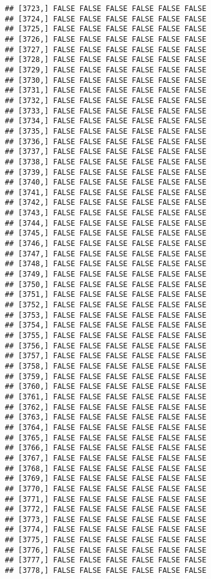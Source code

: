 \documentclass[
]{article}
\begin{document}
\begin{verbatim}
## [3723,] FALSE FALSE FALSE FALSE FALSE FALSE
## [3724,] FALSE FALSE FALSE FALSE FALSE FALSE
## [3725,] FALSE FALSE FALSE FALSE FALSE FALSE
## [3726,] FALSE FALSE FALSE FALSE FALSE FALSE
## [3727,] FALSE FALSE FALSE FALSE FALSE FALSE
## [3728,] FALSE FALSE FALSE FALSE FALSE FALSE
## [3729,] FALSE FALSE FALSE FALSE FALSE FALSE
## [3730,] FALSE FALSE FALSE FALSE FALSE FALSE
## [3731,] FALSE FALSE FALSE FALSE FALSE FALSE
## [3732,] FALSE FALSE FALSE FALSE FALSE FALSE
## [3733,] FALSE FALSE FALSE FALSE FALSE FALSE
## [3734,] FALSE FALSE FALSE FALSE FALSE FALSE
## [3735,] FALSE FALSE FALSE FALSE FALSE FALSE
## [3736,] FALSE FALSE FALSE FALSE FALSE FALSE
## [3737,] FALSE FALSE FALSE FALSE FALSE FALSE
## [3738,] FALSE FALSE FALSE FALSE FALSE FALSE
## [3739,] FALSE FALSE FALSE FALSE FALSE FALSE
## [3740,] FALSE FALSE FALSE FALSE FALSE FALSE
## [3741,] FALSE FALSE FALSE FALSE FALSE FALSE
## [3742,] FALSE FALSE FALSE FALSE FALSE FALSE
## [3743,] FALSE FALSE FALSE FALSE FALSE FALSE
## [3744,] FALSE FALSE FALSE FALSE FALSE FALSE
## [3745,] FALSE FALSE FALSE FALSE FALSE FALSE
## [3746,] FALSE FALSE FALSE FALSE FALSE FALSE
## [3747,] FALSE FALSE FALSE FALSE FALSE FALSE
## [3748,] FALSE FALSE FALSE FALSE FALSE FALSE
## [3749,] FALSE FALSE FALSE FALSE FALSE FALSE
## [3750,] FALSE FALSE FALSE FALSE FALSE FALSE
## [3751,] FALSE FALSE FALSE FALSE FALSE FALSE
## [3752,] FALSE FALSE FALSE FALSE FALSE FALSE
## [3753,] FALSE FALSE FALSE FALSE FALSE FALSE
## [3754,] FALSE FALSE FALSE FALSE FALSE FALSE
## [3755,] FALSE FALSE FALSE FALSE FALSE FALSE
## [3756,] FALSE FALSE FALSE FALSE FALSE FALSE
## [3757,] FALSE FALSE FALSE FALSE FALSE FALSE
## [3758,] FALSE FALSE FALSE FALSE FALSE FALSE
## [3759,] FALSE FALSE FALSE FALSE FALSE FALSE
## [3760,] FALSE FALSE FALSE FALSE FALSE FALSE
## [3761,] FALSE FALSE FALSE FALSE FALSE FALSE
## [3762,] FALSE FALSE FALSE FALSE FALSE FALSE
## [3763,] FALSE FALSE FALSE FALSE FALSE FALSE
## [3764,] FALSE FALSE FALSE FALSE FALSE FALSE
## [3765,] FALSE FALSE FALSE FALSE FALSE FALSE
## [3766,] FALSE FALSE FALSE FALSE FALSE FALSE
## [3767,] FALSE FALSE FALSE FALSE FALSE FALSE
## [3768,] FALSE FALSE FALSE FALSE FALSE FALSE
## [3769,] FALSE FALSE FALSE FALSE FALSE FALSE
## [3770,] FALSE FALSE FALSE FALSE FALSE FALSE
## [3771,] FALSE FALSE FALSE FALSE FALSE FALSE
## [3772,] FALSE FALSE FALSE FALSE FALSE FALSE
## [3773,] FALSE FALSE FALSE FALSE FALSE FALSE
## [3774,] FALSE FALSE FALSE FALSE FALSE FALSE
## [3775,] FALSE FALSE FALSE FALSE FALSE FALSE
## [3776,] FALSE FALSE FALSE FALSE FALSE FALSE
## [3777,] FALSE FALSE FALSE FALSE FALSE FALSE
## [3778,] FALSE FALSE FALSE FALSE FALSE FALSE

\end{verbatim}
\end{document}
